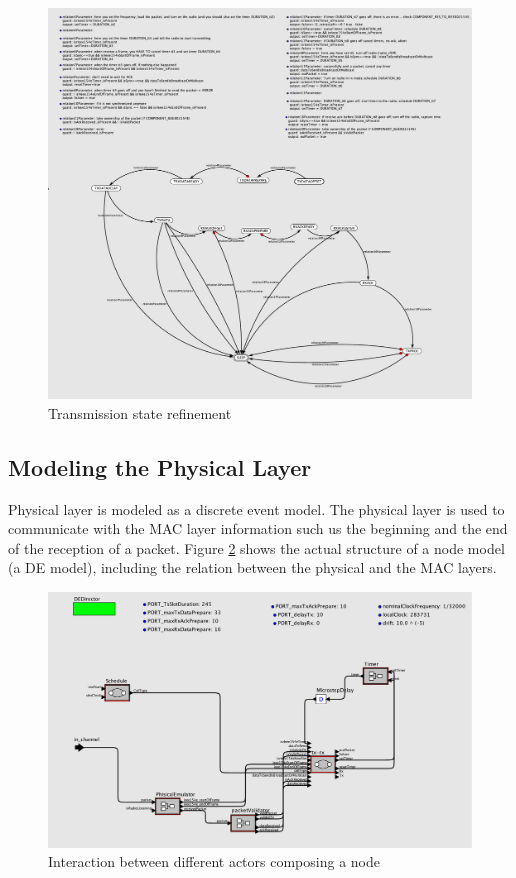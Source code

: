 \begin{figure}
  \centering
  \includegraphics[width=\textwidth]{figures/TransmissionFSM.pdf}
  \caption{Transmission state refinement}
  \label{fig:tx}
\end{figure}

\subsection{Modeling the Physical Layer}
\label{sec:modeling-physical-layer}
Physical layer is modeled as a discrete event model. The physical layer is used to communicate with the MAC layer information such us the beginning and the end of the reception of a packet. Figure \ref{fig:node} shows the actual structure of a node model (a DE model), including the relation between the physical and the MAC layers.

\begin{figure}
  \centering
  \includegraphics[width=\textwidth]{figures/WirelessNode.pdf}
  \caption{Interaction between different actors composing a node}
  \label{fig:node}
\end{figure}


